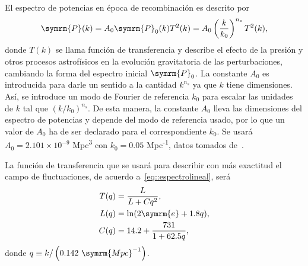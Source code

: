 El espectro de potencias en época de recombinación es descrito por
\begin{equation}
    \symrm{P}(k)=A_0\symrm{P}_0(k)T^2(k)=A_0\left(\frac{k}{k_0}\right)^{n_s}T^2(k),\label{eq::espectrolineal}
\end{equation}
donde \(T(k)\) se llama función de transferencia y describe el efecto de la presión y otros procesos astrofísicos en la evolución gravitatoria de las perturbaciones, cambiando la forma del espectro inicial \(\symrm{P}_0\). La constante \(A_0\) es introducida para darle un sentido a la cantidad \(k^{n_s}\) ya que \(k\) tiene dimensiones. Así, se introduce un modo de Fourier de referencia \(k_0\) para escalar las unidades de \(k\) tal que \(\left(k/k_0\right)^{n_s}\). De esta manera, la constante \(A_0\) lleva las dimensiones del espectro de potencias y depende del modo de referencia usado, por lo que un valor de \(A_0\) ha de ser declarado para el correspondiente \(k_0\). Se usará \(A_0=2.101\times 10^{-9}\) Mpc\textsuperscript{3} con \(k_0=0.05\) Mpc\textsuperscript{-1}, datos tomados de~\cite{collaboration2020planck}.

La función de transferencia que se usará para describir con más     exactitud el campo de fluctuaciones, de acuerdo a~\eqref{eq::espectrolineal}, será~\cite{eisenstein1998baryonic}
\begin{equation}
    \begin{aligned}
        T(q) & =\frac{L}{L+Cq^2},         \\
        L(q) & =\ln(2\symrm{e}+1.8q),     \\
        C(q) & =14.2+\frac{731}{1+62.5q},
    \end{aligned}\label{eq::transff}
\end{equation}
donde \(q\equiv k/\left(0.142\ \symrm{Mpc}^{-1}\right)\).

